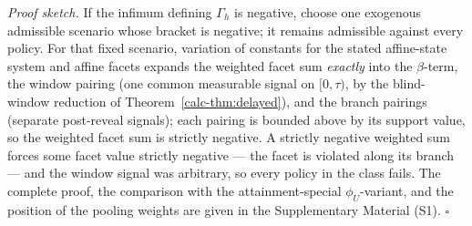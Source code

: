 \documentclass[10pt,twocolumn]{article}
\theoremstyle{definition}
\begin{document}
\emph{Proof sketch.} If the infimum defining \(\Gamma_h\) is negative, choose one exogenous admissible scenario whose bracket is negative; it remains admissible against every policy. For that fixed scenario, variation of constants for the stated affine-state system and affine facets expands the weighted facet sum \emph{exactly} into the \(\beta\)-term, the window pairing (one common measurable signal on \([0, \tau)\), by the blind-window reduction of Theorem~\ref{calc-thm:delayed}), and the branch pairings (separate post-reveal signals); each pairing is bounded above by its support value, so the weighted facet sum is strictly negative. A strictly negative weighted sum forces some facet value strictly negative --- the facet is violated along its branch --- and the window signal was arbitrary, so every policy in the class fails. The complete proof, the comparison with the attainment-special \(\phi_{U}\)-variant, and the position of the pooling weights are given in the Supplementary Material (S1). \hfill\(\square\)
\end{document}
